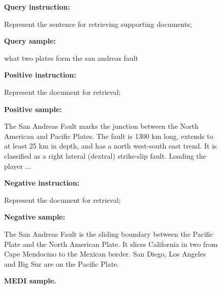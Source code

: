 \documentclass{article}
\begin{document}
\begin{figure}[htbp]
\hrulefill

\textbf{Query instruction:}

\hrulefill

Represent the sentence for retrieving supporting documents;

\hrulefill

\textbf{Query sample:}

\hrulefill

what two plates form the san andreas fault

\hrulefill

\textbf{Positive instruction:}

\hrulefill

Represent the document for retrieval;

\hrulefill

\textbf{Positive sample:}

\hrulefill

The San Andreas Fault marks the junction between the North American and Pacific Plates. The fault is 1300 km long, extends to at least 25 km in depth, and has a north west-south east trend. It is classified as a right lateral (dextral) strike-slip fault. Loading the player ...

\hrulefill

\textbf{Negative instruction:}

\hrulefill

Represent the document for retrieval;

\hrulefill

\textbf{Negative sample:}

\hrulefill

The San Andreas Fault is the sliding boundary between the Pacific Plate and the North American Plate. It slices California in two from Cape Mendocino to the Mexican border. San Diego, Los Angeles and Big Sur are on the Pacific Plate.

\hrulefill

\caption{\textbf{MEDI sample.}}
\label{fig:medi}
\end{figure}
\end{document}
